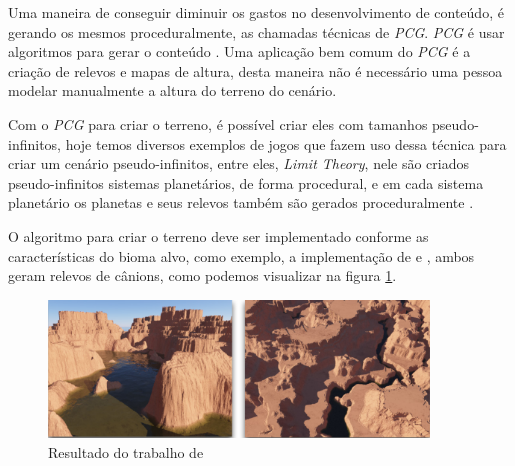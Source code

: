 Uma maneira de conseguir diminuir os gastos no desenvolvimento de conteúdo, é 
gerando os mesmos proceduralmente, as chamadas técnicas de \textit{PCG}. 
\textit{PCG} é usar algoritmos para gerar o conteúdo \cite{shaker2016procedural}.
Uma aplicação bem comum do \textit{PCG} é a criação de relevos e mapas de altura,
desta maneira não é necessário uma pessoa modelar manualmente a altura do
terreno do cenário.

Com o \textit{PCG} para criar o terreno, é possível criar eles com tamanhos
pseudo-infinitos, hoje temos diversos exemplos de jogos que fazem uso dessa técnica
para criar um cenário pseudo-infinitos, entre eles, \textit{Limit Theory}, nele
são criados pseudo-infinitos sistemas planetários, de forma procedural, e em cada
sistema planetário os planetas e seus relevos também são gerados proceduralmente
\cite{abreu1990toward}.

O algoritmo para criar o terreno deve ser implementado conforme as
características do bioma alvo, como exemplo, a implementação de 
\cite{gabrielle2016canion} e \cite{carli2012canion}, ambos geram relevos de
cânions, como podemos visualizar na figura \ref{fig:carli2012result}.
\begin{figure}[H]
    \centering
    \includegraphics[width=0.9\textwidth]{figuras/carli2012result.png}
    \caption{Resultado do trabalho de \cite{carli2012canion}}
    \label{fig:carli2012result}
\end{figure}

